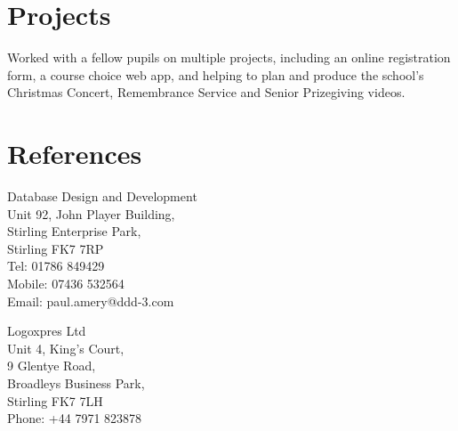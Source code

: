 \documentclass[]{hieudo-build}
\begin{document}
\begin{minipage}[t]{0.62\textwidth}
\section{Projects}

\begin{tightemize}
    \item Worked with a fellow pupils on multiple projects, including an online registration form, a course choice web app, and helping to plan and produce the school’s Christmas Concert, Remembrance Service and Senior Prizegiving videos.
\end{tightemize}
\sectionsep

\end{minipage} 

\newpage

\section{References}

\begin{minipage}[t]{0.36\textwidth} 

Database Design and Development \\
\minisectionsep
Unit 92, John Player Building, \\
Stirling Enterprise Park, \\
Stirling FK7 7RP \\
\minisectionsep
Tel: 01786 849429 \\
Mobile: 07436 532564 \\
Email: paul.amery@ddd-3.com \\

\end{minipage}
\hfill
\begin{minipage}[t]{0.62\textwidth}

Logoxpres Ltd \\
\minisectionsep
Unit 4, King's Court, \\
9 Glentye Road, \\
Broadleys Business Park, \\
Stirling FK7 7LH \\
\minisectionsep
Phone: +44 7971 823878 \\
\end{minipage}
\end{document}
